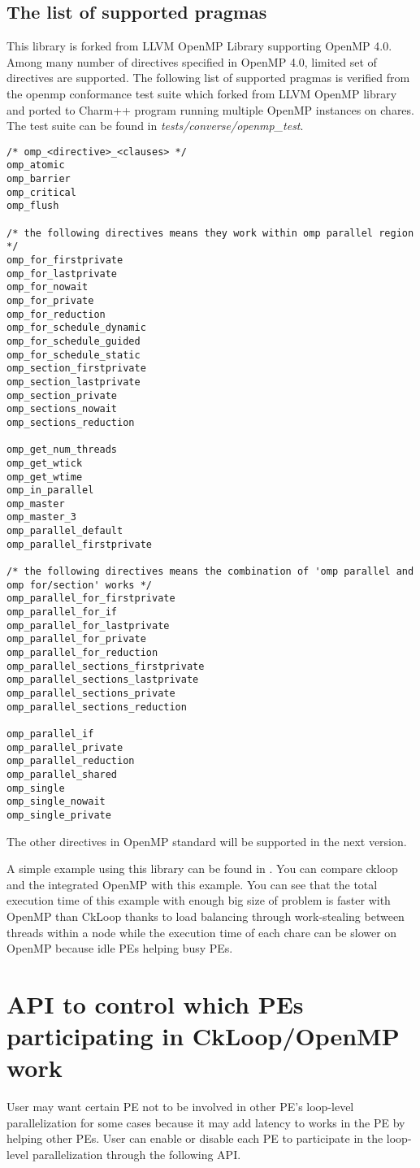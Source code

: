 \subsection{The list of supported pragmas}
This library is forked from LLVM OpenMP Library supporting OpenMP 4.0. Among many number of
directives specified in OpenMP 4.0,  limited set of directives are supported.
The following list of supported pragmas is verified from the openmp conformance test suite which forked from LLVM OpenMP library and ported to Charm++ program running multiple OpenMP instances on chares. The test suite can be found in \emph{tests/converse/openmp\_test}.
\begin{verbatim}
/* omp_<directive>_<clauses> */
omp_atomic
omp_barrier
omp_critical
omp_flush

/* the following directives means they work within omp parallel region */
omp_for_firstprivate
omp_for_lastprivate
omp_for_nowait
omp_for_private
omp_for_reduction
omp_for_schedule_dynamic
omp_for_schedule_guided
omp_for_schedule_static
omp_section_firstprivate
omp_section_lastprivate
omp_section_private
omp_sections_nowait
omp_sections_reduction

omp_get_num_threads
omp_get_wtick
omp_get_wtime
omp_in_parallel
omp_master
omp_master_3
omp_parallel_default
omp_parallel_firstprivate

/* the following directives means the combination of 'omp parallel and omp for/section' works */
omp_parallel_for_firstprivate
omp_parallel_for_if
omp_parallel_for_lastprivate
omp_parallel_for_private
omp_parallel_for_reduction
omp_parallel_sections_firstprivate
omp_parallel_sections_lastprivate
omp_parallel_sections_private
omp_parallel_sections_reduction

omp_parallel_if
omp_parallel_private
omp_parallel_reduction
omp_parallel_shared
omp_single
omp_single_nowait
omp_single_private
\end{verbatim}
The other directives in OpenMP standard will be supported in the next version.

A simple example using this library can be found in . You can compare ckloop
and the integrated OpenMP with this example. You can see that the total execution time of
this example with enough big size of problem is faster with OpenMP than CkLoop thanks to
load balancing through work-stealing between threads within a node while the execution
time of each chare can be slower on OpenMP because idle PEs helping busy PEs.
\section{API to control which PEs participating in CkLoop/OpenMP work}
User may want certain PE not to be involved in other PE's loop-level parallelization for some cases because it may add latency to works in the PE by helping other PEs. User can enable or disable each PE to participate in the loop-level parallelization through the following API.

